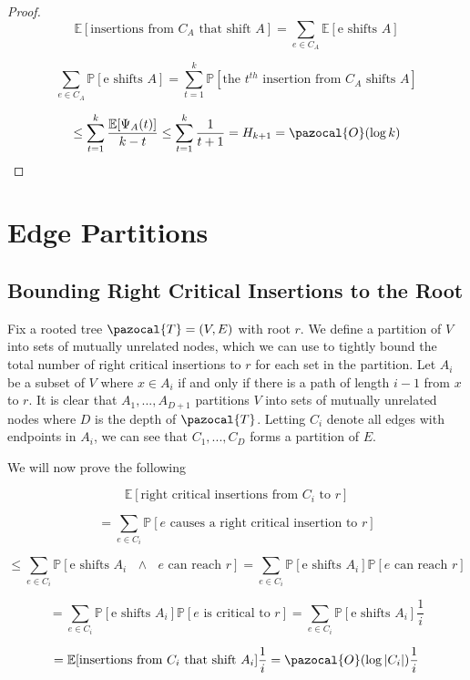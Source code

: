 \documentclass{article}
\begin{document}
\begin{proof}
\[ \mathbb{E}[\textrm{insertions from $C_A$ that shift $A$}] = \sum_{e \in C_A} \mathbb{E}[\textrm{e shifts $A$}] \]

\[ \sum_{e \in C_A} \mathbb{P}[\textrm{e shifts $A$}]  = \sum_{t = 1}^{k} \mathbb{P}[\textrm{the $t^{th}$ insertion from $C_A$ shifts $A$}] \]

\[ \leq \sum_{t = 1}^{k} \frac{\mathbb{E}[\Psi_A(t)]}{k-t} \leq \sum_{t = 1}^{k} \frac{1}{t+1} = H_{k+1} = \pazocal{O}(\log k) \]
\end{proof}

\section{Edge Partitions}

\subsection{Bounding Right Critical Insertions to the Root}

Fix a rooted tree $\pazocal{T} = (V,E)$ with root $r$. We define a partition of $V$ into sets of mutually unrelated nodes, which we can use to tightly bound the total number of right critical insertions to $r$ for each set in the partition. Let $A_i$ be a subset of $V$ where $x \in A_i$ if and only if there is a path of length $i-1$ from $x$ to $r$. It is clear that $A_1,..., A_{D+1}$ partitions $V$ into sets of mutually unrelated nodes where $D$ is the depth of $\pazocal{T}$. Letting $C_i$ denote all edges with endpoints in $A_i$, we can see that $C_1,...,C_D$ forms a partition of $E$.

We will now prove the following

\[
\mathbb{E} [\textrm{right critical insertions from  $C_i$ to $r$}]
\]

\[
= \sum_{e \in C_i} \mathbb{P}[\textrm{$e$ causes a right critical insertion to $r$}]
\]

\[
\leq \sum_{e \in C_i} \mathbb{P}[\textrm{e shifts $A_i$ $\land$ $e$ can reach $r$}] = \sum_{e \in C_i} \mathbb{P}[\textrm{e shifts $A_i$}] \mathbb{P}[\textrm{$e$ can reach $r$}]
\]

\[
= \sum_{e \in C_i} \mathbb{P}[\textrm{e shifts $A_i$}] \mathbb{P}[\textrm{$e$ is critical to $r$}] = \sum_{e \in C_i} \mathbb{P}[\textrm{e shifts $A_i$}] \frac{1}{i}
\]

\[
=\mathbb{E}[\textrm{insertions from $C_i$ that shift $A_i$}] \frac{1}{i} = \pazocal{O}(\log \vert C_i \vert)\frac{1}{i}
\]
\end{document}

